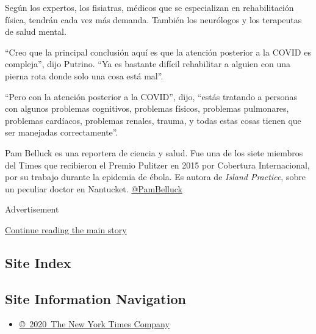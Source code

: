 Según los expertos, los fisiatras, médicos que se especializan en
rehabilitación física, tendrán cada vez más demanda. También los
neurólogos y los terapeutas de salud mental.

``Creo que la principal conclusión aquí es que la atención posterior a
la COVID es compleja'', dijo Putrino. ``Ya es bastante difícil
rehabilitar a alguien con una pierna rota donde solo una cosa está
mal''.

``Pero con la atención posterior a la COVID'', dijo, ``estás tratando a
personas con algunos problemas cognitivos, problemas físicos, problemas
pulmonares, problemas cardíacos, problemas renales, trauma, y todas
estas cosas tienen que ser manejadas correctamente''.

Pam Belluck es una reportera de ciencia y salud. Fue una de los siete
miembros del Times que recibieron el Premio Pulitzer en 2015 por
Cobertura Internacional, por su trabajo durante la epidemia de ébola. Es
autora de \emph{Island Practice}, sobre un peculiar doctor en Nantucket.
\href{https://twitter.com/PamBelluck}{@PamBelluck}

Advertisement

\protect\hyperlink{after-bottom}{Continue reading the main story}

\hypertarget{site-index}{%
\subsection{Site Index}\label{site-index}}

\hypertarget{site-information-navigation}{%
\subsection{Site Information
Navigation}\label{site-information-navigation}}

\begin{itemize}
\tightlist
\item
  \href{https://help.nytimes.com/hc/en-us/articles/115014792127-Copyright-notice}{©~2020~The
  New York Times Company}
\end{itemize}

